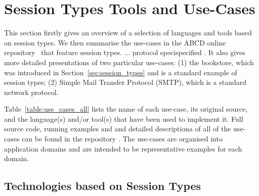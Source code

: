
\section{Session Types Tools and Use-Cases}
\label{sec:usecases}

This section firstly gives an overview of a selection of languages and tools based on session types.  We then summarise the use-cases in the ABCD online repository~\cite{usecase_repository} that feature session types.  ... protocol specispecified . It also gives more detailed presentations of two particular use-cases: (1) the bookstore, which was introduced in Section~\ref{sec:session_types} and is a standard example of session types; (2) Simple Mail Transfer Protocol (SMTP), which is a standard network protocol.



Table~\ref{table:use_cases_all} lists the name of each use-case, its original source, and the language(s) and/or tool(s) that have been used to implement it. Full source code,
running examples and and detailed descriptiona of all of the use-cases can be found in the repository \cite{usecase_repository}.
The use-cases are organised into application domains and are intended to be representative examples for each domain.


\subsection{Technologies based on Session Types}

